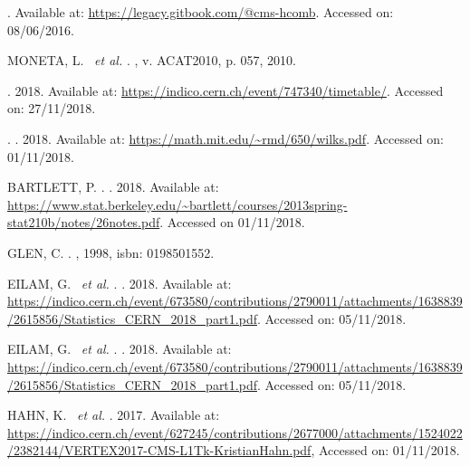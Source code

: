 \begin{thebibliography}{}
.
Available at: \url{https://legacy.gitbook.com/@cms-hcomb}.
Accessed on: 08/06/2016.

MONETA, L. ~\textit{et al.}
.
, v. ACAT2010, p. 057, 2010.

.
2018.
Available at: \url{https://indico.cern.ch/event/747340/timetable/}.
Accessed on: 27/11/2018.

. 
.
2018.
Available at: \url{https://math.mit.edu/~rmd/650/wilks.pdf}.
Accessed on: 01/11/2018.

BARTLETT, P.
. 
.
2018.
Available at: \url{https://www.stat.berkeley.edu/~bartlett/courses/2013spring-stat210b/notes/26notes.pdf}.
Accessed on 01/11/2018.

GLEN, C.
.
, 1998, isbn: 0198501552.

EILAM, G. ~\textit{et al.}
. 
.
2018.
Available at: \url{https://indico.cern.ch/event/673580/contributions/2790011/attachments/1638839/2615856/Statistics\_CERN\_2018\_part1.pdf}.
Accessed on: 05/11/2018.

EILAM, G. ~\textit{et al.}
. 
.
2018.
Available at: \url{https://indico.cern.ch/event/673580/contributions/2790011/attachments/1638839/2615856/Statistics\_CERN\_2018\_part1.pdf}.
Accessed on: 05/11/2018.


HAHN, K. ~\textit{et al.}
. 2017.
Available at: \url{https://indico.cern.ch/event/627245/contributions/2677000/attachments/1524022/2382144/VERTEX2017-CMS-L1Tk-KristianHahn.pdf},
Accessed on: 01/11/2018.


\end{thebibliography}
